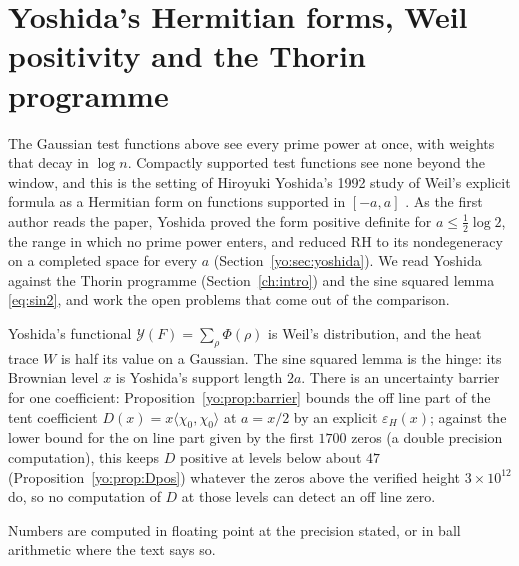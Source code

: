 \chapter{Yoshida's Hermitian forms, Weil positivity and the Thorin programme}\label{chap:yoshida}\label{yo:chapter}

The Gaussian test functions above see every prime power at once, with weights that decay in $\log n$. Compactly supported test functions see none beyond the window, and this is the setting of Hiroyuki Yoshida's 1992 study of Weil's explicit formula as a Hermitian form on functions supported in $[-a,a]$ \cite{Yoshida92}. As the first author reads the paper, Yoshida proved the form positive definite for $a\le\frac12\log2$, the range in which no prime power enters, and reduced RH to its nondegeneracy on a completed space for every $a$ (Section~\ref{yo:sec:yoshida}). We read Yoshida against the Thorin programme (Section~\ref{ch:intro}) and the sine squared lemma \eqref{eq:sin2}, and work the open problems that come out of the comparison.

Yoshida's functional $\mathcal Y(F)=\sum_\rho\Phi(\rho)$ is Weil's distribution, and the heat trace $W$ is half its value on a Gaussian. The sine squared lemma is the hinge: its Brownian level $x$ is Yoshida's support length $2a$. There is an uncertainty barrier for one coefficient: Proposition~\ref{yo:prop:barrier} bounds the off line part of the tent coefficient $D(x)=x\langle\chi_0,\chi_0\rangle$ at $a=x/2$ by an explicit $\varepsilon_H(x)$; against the lower bound for the on line part given by the first $1700$ zeros (a double precision computation), this keeps $D$ positive at levels below about $47$ (Proposition~\ref{yo:prop:Dpos}) whatever the zeros above the verified height $3\times10^{12}$ \cite{PT21} do, so no computation of $D$ at those levels can detect an off line zero.

Numbers are computed in floating point at the precision stated, or in ball arithmetic where the text says so.
